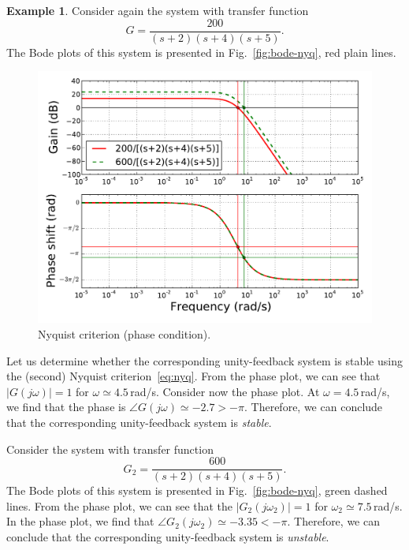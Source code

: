 \documentclass[a4paper,11pt]{report}
\theoremstyle{definition}
\newtheorem{mdexample}{Example}
\newenvironment{example}%
  {\vspace{0.1cm}\begin{mdframed}[backgroundcolor=lightgray]\begin{mdexample}}%
  {\end{mdexample}\end{mdframed}\vspace{0.1cm}}
\begin{document}
\begin{example}
  \label{ex:nyq2}
  Consider again the system with transfer function 
  \[
  G=\frac{200}{(s+2)(s+4)(s+5)}.
  \]
  The Bode plots of this system is presented in
  Fig.~\ref{fig:bode-nyq}, red plain lines.
  \begin{figure}[H]
    \centering
    \includegraphics[width=12cm]{fig/bode-nyq2.pdf}
    \caption{Nyquist criterion (phase condition).}
    \label{fig:bode-nyq2}
  \end{figure}

  Let us determine whether the corresponding unity-feedback system is
  stable using the (second) Nyquist criterion~\ref{eq:nyq}. From the
  phase plot, we can see that $|G(j\omega)| = 1$ for $\omega\simeq
  4.5$\,rad/s. Consider now the phase plot. At $\omega=4.5$\,rad/s, we
  find that the phase is $\angle G(j\omega)\simeq
  -2.7>-\pi$. Therefore, we can conclude that the corresponding
  unity-feedback system is \emph{stable}.

  Consider the system with transfer function 
  \[
  G_2=\frac{600}{(s+2)(s+4)(s+5)}.
  \]
  The Bode plots of this system is presented in
  Fig.~\ref{fig:bode-nyq}, green dashed lines. From the phase plot, we
  can see that the $|G_2(j\omega_2)| = 1$ for $\omega_2\simeq
  7.5$\,rad/s. In the phase plot, we find that $\angle
  G_2(j\omega_2)\simeq -3.35<-\pi$. Therefore, we can conclude that
  the corresponding unity-feedback system is \emph{unstable}.
\end{example}



\end{document}
